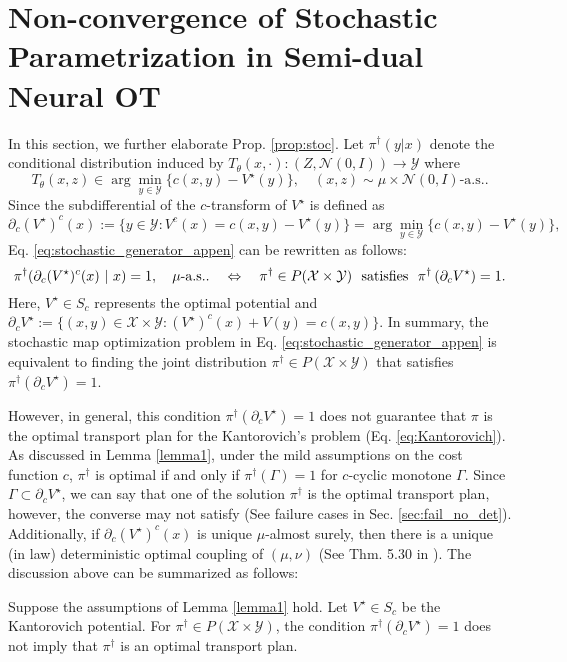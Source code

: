 \section{Non-convergence of Stochastic Parametrization in Semi-dual Neural OT} \label{appen:non_conv_stocas_param} 
In this section, we further elaborate Prop. \ref{prop:stoc}. Let $\pi^\dagger(y | x)$ denote the conditional distribution induced by $T_\theta(x, \cdot):(Z, \mathcal{N}(0,I))\rightarrow \mathcal{Y}$ where
\begin{equation} \label{eq:stochastic_generator_appen}
    T_\theta (x,z) \in \arg\min_{y\in \mathcal{Y}} \{ c(x,y) - V^\star(y) \}, \quad (x, z) \sim \mu\times \mathcal{N}(0, I)\text{-a.s.}.
\end{equation}
Since the subdifferential of the $c$-transform of $V^{\star}$ is defined as 
\begin{equation}
    \partial_c (V^\star)^c(x) := \{y\in \mathcal{Y}: V^c (x) = c(x,y) - V^\star(y) \} = \arg\min_{y\in \mathcal{Y}} \{ c(x,y) - V^\star(y) \},
\end{equation}
Eq. \ref{eq:stochastic_generator_appen} can be rewritten as follows:
\begin{equation} \label{eq:stochastic-formal}
    \pi^\dagger (\partial_c (V^\star)^c (x) \,\,| \,\, x) = 1, \quad \mu\text{-a.s..} 
 \quad \Leftrightarrow \quad \pi^\dagger \in P(\mathcal{X}\times\mathcal{Y}) \,\, \hbox{ satisfies } \,\, \pi^\dagger \left( \partial_c V^\star \right) = 1.
\end{equation}
Here, $V^\star \in S_c$ represents the optimal potential and $\partial_c V^\star := \{(x,y)\in \mathcal{X}\times \mathcal{Y} : (V^\star)^c (x) + V(y) = c(x,y)\}$.
In summary, the stochastic map optimization problem in Eq. \ref{eq:stochastic_generator_appen} is equivalent to finding the joint distribution $\pi^\dagger \in P(\mathcal{X}\times \mathcal{Y})$ that satisfies $\pi^\dagger (\partial_c V^\star) = 1$.

However, in general, this condition $\pi^\dagger (\partial_c V^\star) = 1$ does not guarantee that $\pi$ is the optimal transport plan for the Kantorovich's problem (Eq. \ref{eq:Kantorovich}). As discussed in Lemma \ref{lemma1}, under the mild assumptions on the cost function $c$, $\pi^\dagger$ is optimal if and only if $\pi^\dagger (\Gamma) = 1$ for $c$-cyclic monotone $\Gamma$. Since $\Gamma \subset \partial_c V^\star$, we can say that one of the solution $\pi^\dagger$ is the optimal transport plan, however, the converse may not satisfy (See failure cases in Sec. \ref{sec:fail_no_det}). Additionally, if $\partial_c (V^\star)^c (x)$ is unique $\mu$-almost surely, then there is a unique (in law) deterministic optimal coupling of $(\mu, \nu)$ (See Thm. 5.30 in \citet{villani}).
The discussion above can be summarized as follows:
\begin{proposition}[Formal]
\label{prop:stoc_appen}
    Suppose the assumptions of Lemma \ref{lemma1} hold. Let $V^\star\in S_c$ be the Kantorovich potential. For $\pi^\dagger \in P(\mathcal{X}\times\mathcal{Y})$, the condition $\pi^\dagger (\partial_c V^\star) = 1$ does not imply that $\pi^\dagger$ is an optimal transport plan.
\end{proposition}

